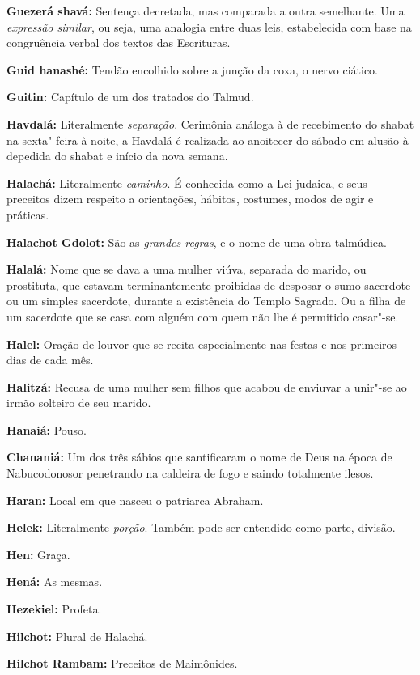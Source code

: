 \begin{hangparas}{.25in}{1}
{\textbf{Guezerá shavá:} Sentença decretada, mas comparada a outra semelhante. Uma \emph{expressão similar}, ou seja, uma analogia entre duas leis, estabelecida com base na congruência verbal dos textos das Escrituras.

\textbf{Guid hanashé:} Tendão encolhido sobre a junção da coxa, o nervo ciático.

\textbf{Guitin:} Capítulo de um dos tratados do Talmud.

\textbf{Havdalá:} Literalmente \emph{separação}. Cerimônia análoga à 
de recebimento do shabat na sexta"-feira à noite, a Havdalá é 
realizada ao anoitecer do sábado em alusão à depedida do shabat 
e início da nova semana.

\textbf{Halachá:} Literalmente \emph{caminho}. É conhecida como a 
Lei judaica, e seus preceitos dizem respeito a orientações, hábitos, 
costumes, modos de agir e práticas.

\textbf{Halachot Gdolot:} São as \emph{grandes regras}, e o nome de 
uma obra talmúdica.

\textbf{Halalá:} Nome que se dava a uma mulher viúva, separada do
marido, ou prostituta, que estavam terminantemente proibidas de desposar
o sumo sacerdote ou um simples sacerdote, durante a existência do Templo
Sagrado. Ou a filha de um sacerdote que se casa com alguém com quem não lhe é
permitido casar"-se.

\textbf{Halel:} Oração de louvor que se recita especialmente nas
festas e nos primeiros dias de cada mês.

\textbf{Halitzá:} Recusa de uma mulher sem filhos que acabou de
enviuvar a unir"-se ao irmão solteiro de seu marido.

\textbf{Hanaiá:} Pouso.

\textbf{Chananiá:} Um dos três sábios que santificaram o nome de Deus
na época de Nabucodonosor penetrando na caldeira de fogo e saindo
totalmente ilesos.

\textbf{Haran:} Local em que nasceu o patriarca Abraham.

\textbf{Helek:} Literalmente \emph{porção}. Também pode ser 
entendido como parte, divisão.

\textbf{Hen:} Graça.

\textbf{Hená:} As mesmas.

\textbf{Hezekiel:} Profeta.

\textbf{Hilchot:} Plural de Halachá.

\textbf{Hilchot Rambam:} Preceitos de Maimônides.

}
\end{hangparas}
